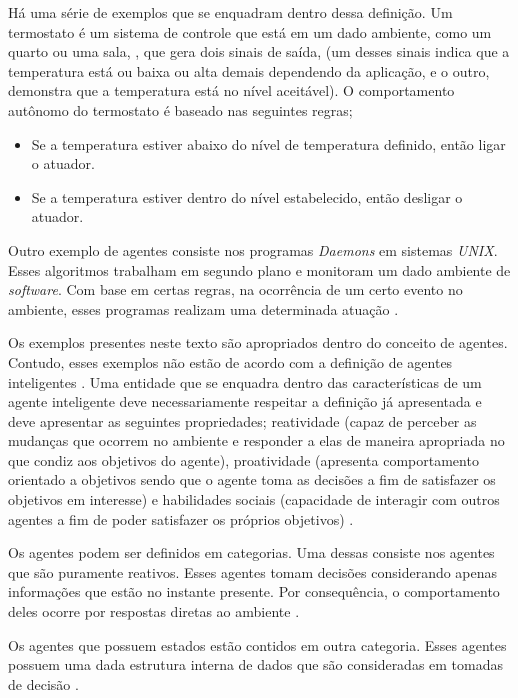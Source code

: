 Há uma série de exemplos que se enquadram dentro dessa definição. Um termostato é um sistema de controle que está em um dado ambiente, como um quarto ou uma sala, \cite{whatisagent}, que gera dois sinais de saída, (um desses sinais indica que a temperatura está ou baixa ou alta demais dependendo da aplicação, e o outro, demonstra que a temperatura está no nível aceitável). O comportamento autônomo do termostato é baseado nas seguintes regras;

\begin{itemize}
    \item Se a temperatura estiver abaixo do nível de temperatura definido, então ligar o atuador.
    \item Se a temperatura estiver dentro do nível estabelecido, então desligar o atuador.
\end{itemize}

Outro exemplo de agentes consiste nos programas \textit{Daemons} em sistemas \textit{UNIX}. Esses algoritmos trabalham em segundo plano e monitoram um dado ambiente de \textit{software}. Com base em certas regras, na ocorrência de um certo evento no ambiente, esses programas realizam uma determinada atuação \cite{whatisagent}.   

Os exemplos presentes neste texto são apropriados dentro do conceito de agentes. Contudo, esses exemplos não estão de acordo com a definição de agentes inteligentes \cite{whatisagent}. Uma entidade que se enquadra dentro das características de um agente inteligente deve necessariamente respeitar a definição já apresentada e deve apresentar as seguintes propriedades; reatividade (capaz de perceber as mudanças
que ocorrem no ambiente e responder a elas de maneira apropriada no que condiz aos objetivos do agente), proatividade (apresenta comportamento orientado a objetivos sendo que o agente toma as decisões a fim de satisfazer os objetivos em interesse) e habilidades sociais (capacidade de interagir com outros agentes a fim de poder satisfazer os próprios objetivos) \cite{whatisagent} \cite{artificialinteligencemodermapproach}.

Os agentes podem ser definidos em categorias. Uma dessas consiste nos agentes que são puramente reativos. Esses agentes tomam decisões considerando apenas informações que estão no instante presente. Por consequência, o comportamento deles ocorre por respostas diretas ao ambiente \cite{whatisagent}. 

Os agentes que possuem estados estão contidos em outra categoria. Esses agentes possuem uma dada estrutura interna de dados que são consideradas em tomadas de decisão \cite{whatisagent}.

